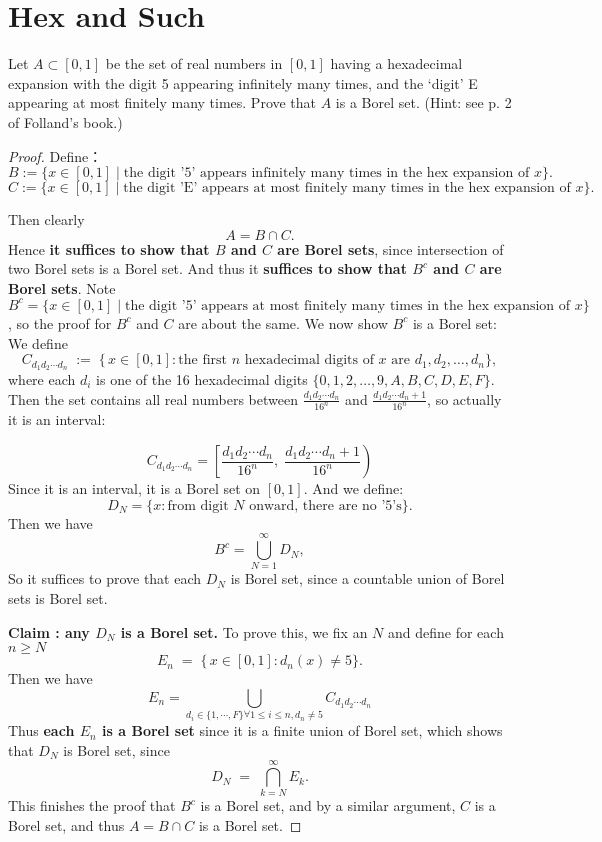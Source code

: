 \documentclass[lang=cn,11pt]{elegantbook}
\begin{document}
\section{Hex and Such}
Let $A \subset [0,1]$ be the set of real numbers in $[0,1]$ having a hexadecimal expansion with the digit 5 appearing infinitely many times, and the ‘digit’ E appearing at most finitely many times. Prove that $A$ is a Borel set. (Hint: see p. 2 of Folland’s book.)
\begin{proof}
Define：
   \[
   B := \{ x \in [0,1] \mid \text{the digit '5' appears infinitely many times in the hex expansion of }x \}.
   \]\[
   C := \{ x \in [0,1] \mid \text{the digit 'E' appears at most finitely many times in the hex expansion of }x \}.
   \]

\noindent Then clearly
\[
A = B \cap C.
\]
\noindent Hence \textbf{it suffices to show that \(B\) and \(C\) are Borel sets}, since intersection of two Borel sets is a Borel set.
\noindent And thus it \textbf{suffices to show that $B^c$ and $C$ are Borel sets}. Note 
$$B^c = \{ x \in [0,1] \mid \text{the digit '5' appears at most finitely many times in the hex expansion of }x \}$$, so the proof for $B^c$ and $C$ are about the same.
\noindent We now show $B^c$ is a Borel set:
\noindent  We define
\[
     C_{d_1 d_2 \cdots d_n} \;:=\; \bigl\{\, x\in[0,1] : \text{the first }n\text{ hexadecimal digits of }x \text{ are }d_1, d_2, \ldots, d_n \bigr\},
   \]
where each \(d_i\) is one of the 16 hexadecimal digits \(\{0, 1, 2, \dots, 9, A, B, C, D, E, F\}\).  
 Then the set contains all real numbers between $\frac{d_1d_2\cdots d_n}{16^n}$ and $\frac{d_1d_2\cdots d_n + 1}{16^n}$, so actually it is an interval:

   \[
     C_{d_1 d_2 \cdots d_n} =   \left[\frac{d_1d_2\cdots d_n}{16^n},\;\frac{d_1d_2\cdots d_n + 1}{16^n}\right)
   \]
 Since it is an interval, it is a Borel set on \([0,1]\).
\noindent And we define:
\[
D_N = \{ x : \text{from digit \(N\) onward, there are no '5's} \}.
\]
Then we have
\[
B^c = \bigcup_{N=1}^{\infty} D_N,
\]
So it suffices to prove that each $D_N$ is Borel set, since a countable union of Borel sets is Borel set.

\noindent   \textbf{Claim : any $D_N$ is a Borel set.}
To prove this, we fix  an $N$ and define for each $n \geq N$
\[
     E_n 
     \;=\; 
     \{\,x \in [0,1]: d_n(x)\neq 5\}.
   \]
 \noindent  Then we have 
$$
E_n = \bigcup_{d_i \in \{1,\cdots,F\}   \forall 1\leq i \leq n, d_n \not = 5}  C_{d_1d_2\cdots d_n}
$$
 Thus \textbf{each $E_n$ is a Borel set} since it is a finite union of Borel set, which shows that $D_N$ is Borel set, since 
 \[
     D_N 
     \;=\;
     \bigcap_{k = N}^{\infty} E_k.
   \]
This finishes the proof that $B^c$ is a Borel set, and by a similar argument, $C$ is a Borel set, and thus $A = B \cap C$ is a Borel set. 
   
\end{proof}
\end{document}
